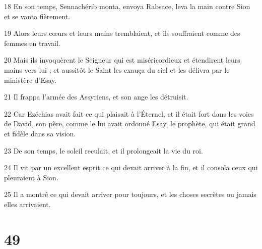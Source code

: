 \par 18 En son temps, Sennachérib monta, envoya Rabsace, leva la main contre Sion et se vanta fièrement.
\par 19 Alors leurs cœurs et leurs mains tremblaient, et ils souffraient comme des femmes en travail.
\par 20 Mais ils invoquèrent le Seigneur qui est miséricordieux et étendirent leurs mains vers lui ; et aussitôt le Saint les exauça du ciel et les délivra par le ministère d'Esay.
\par 21 Il frappa l'armée des Assyriens, et son ange les détruisit.
\par 22 Car Ezéchias avait fait ce qui plaisait à l'Éternel, et il était fort dans les voies de David, son père, comme le lui avait ordonné Esay, le prophète, qui était grand et fidèle dans sa vision.
\par 23 De son temps, le soleil reculait, et il prolongeait la vie du roi.
\par 24 Il vit par un excellent esprit ce qui devait arriver à la fin, et il consola ceux qui pleuraient à Sion.
\par 25 Il a montré ce qui devait arriver pour toujours, et les choses secrètes ou jamais elles arrivaient.

\chapter{49}

